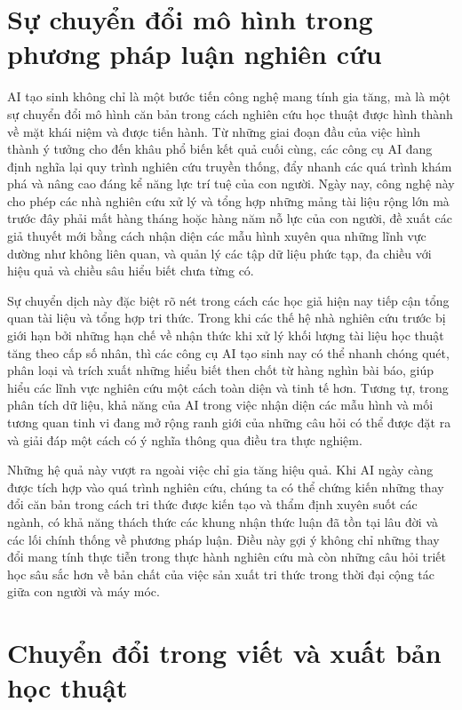 \section{Sự chuyển đổi mô hình trong phương pháp luận nghiên cứu}

AI tạo sinh không chỉ là một bước tiến công nghệ mang tính gia tăng, mà là một sự chuyển đổi mô hình căn bản trong cách nghiên cứu học thuật được hình thành về mặt khái niệm và được tiến hành. Từ những giai đoạn đầu của việc hình thành ý tưởng cho đến khâu phổ biến kết quả cuối cùng, các công cụ AI đang định nghĩa lại quy trình nghiên cứu truyền thống, đẩy nhanh các quá trình khám phá và nâng cao đáng kể năng lực trí tuệ của con người. Ngày nay, công nghệ này cho phép các nhà nghiên cứu xử lý và tổng hợp những mảng tài liệu rộng lớn mà trước đây phải mất hàng tháng hoặc hàng năm nỗ lực của con người, đề xuất các giả thuyết mới bằng cách nhận diện các mẫu hình xuyên qua những lĩnh vực dường như không liên quan, và quản lý các tập dữ liệu phức tạp, đa chiều với hiệu quả và chiều sâu hiểu biết chưa từng có.

Sự chuyển dịch này đặc biệt rõ nét trong cách các học giả hiện nay tiếp cận tổng quan tài liệu và tổng hợp tri thức. Trong khi các thế hệ nhà nghiên cứu trước bị giới hạn bởi những hạn chế về nhận thức khi xử lý khối lượng tài liệu học thuật tăng theo cấp số nhân, thì các công cụ AI tạo sinh nay có thể nhanh chóng quét, phân loại và trích xuất những hiểu biết then chốt từ hàng nghìn bài báo, giúp hiểu các lĩnh vực nghiên cứu một cách toàn diện và tinh tế hơn. Tương tự, trong phân tích dữ liệu, khả năng của AI trong việc nhận diện các mẫu hình và mối tương quan tinh vi đang mở rộng ranh giới của những câu hỏi có thể được đặt ra và giải đáp một cách có ý nghĩa thông qua điều tra thực nghiệm.

Những hệ quả này vượt ra ngoài việc chỉ gia tăng hiệu quả. Khi AI ngày càng được tích hợp vào quá trình nghiên cứu, chúng ta có thể chứng kiến những thay đổi căn bản trong cách tri thức được kiến tạo và thẩm định xuyên suốt các ngành, có khả năng thách thức các khung nhận thức luận đã tồn tại lâu đời và các lối chính thống về phương pháp luận. Điều này gợi ý không chỉ những thay đổi mang tính thực tiễn trong thực hành nghiên cứu mà còn những câu hỏi triết học sâu sắc hơn về bản chất của việc sản xuất tri thức trong thời đại cộng tác giữa con người và máy móc.

\section{Chuyển đổi trong viết và xuất bản học thuật}

